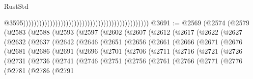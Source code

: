 \begin{lexlean}{RustStd}
\begin{coremodule}
{\begin{coremodule}
{{{{{{{{{{{{{{{{{{{{{{{{{{{{{{{{{{{{{{{{{{{{{{{{{{{{{{{{{{{{{{{{{{{{                                                                                                  @3595)))))))))))))))))))))))))))))))))))))))))))))))
@3691 := @2569
    (@2574
      (@2579
        (@2583
          (@2588
            (@2593
              (@2597
                (@2602
                  (@2607
                    (@2612
                      (@2617
                        (@2622
                          (@2627
                            (@2632
                              (@2637
                                (@2642
                                  (@2646
                                    (@2651
                                      (@2656
                                        (@2661
                                          (@2666
                                            (@2671
                                              (@2676
                                                (@2681
                                                  (@2686
                                                    (@2691
                                                      (@2696
                                                        (@2701
                                                          (@2706
                                                            (@2711
                                                              (@2716
                                                                (@2721
                                                                  (@2726
                                                                    (@2731
                                                                      (@2736
                                                                        (@2741
                                                                          (@2746
                                                                            (@2751
                                                                              (@2756
                                                                                (@2761
                                                                                  (@2766
                                                                                    (@2771
                                                                                      (@2776
                                                                                        (@2781
                                                                                          (@2786
                                                                                            (@2791
}}}}}}}}}}}}}}}}}}}}}}}}}}}}}}}}}}}}}}}}}}}}}}}}}}}}}}}}}}}}}}}}}}}}
\end{coremodule}}
\end{coremodule}
\end{lexlean}
